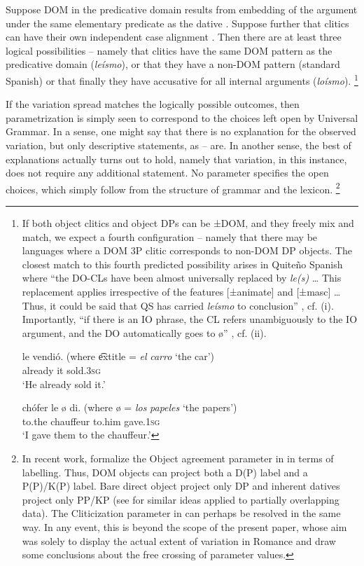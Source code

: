 \documentclass[output=paper,colorlinks,citecolor=brown,nonflat]{./langscibook}
\begin{document}
Suppose DOM in the predicative domain results from embedding of the argument under the same elementary predicate as the dative . Suppose further that clitics can have their own independent case alignment . Then there are at least three logical possibilities – namely that clitics have the same DOM pattern as the predicative domain (\textit{leísmo}), or that they have a non-DOM pattern (standard Spanish) or that finally they have accusative for all internal arguments (\textit{loísmo}).{} \footnote{If both object clitics and object DPs can be ±DOM, and they freely mix and match, we expect a fourth configuration – namely that there may be languages where a DOM 3P clitic corresponds to non-DOM DP objects. The closest match to this fourth predicted possibility arises in Quiteño Spanish where “the DO-CLs have been almost universally replaced by \textit{le(s)} … This replacement applies irrespective of the features [±animate] and [±masc] …Thus, it could be said that QS has carried \textit{leísmo} to conclusion” \citep[387--388]{Suñer1989}, cf. (i). Importantly, “if there is an IO phrase, the CL refers unambiguously to the IO argument, and the DO automatically goes to ø” \citep[389]{Suñer1989}, cf. (ii).  

\ea%
    
     {le}   {vendió}.   \hfill (where \t	extit{le} {=} \textit{el} \textit{carro} ‘the car’)\\
        already   it   sold\textsc{.3sg}\\
    \glt ‘He already sold it.’
\z

\ea%
    
     {chófer}  {le}   {ø} {di}.   \hfill (where {ø} = \textit{los} \textit{papeles} ‘the papers’)\\
        to.the chauffeur   to.him   {} gave.\textsc{1sg}\\
    \glt ‘I gave them to the chauffeur.’
\z
}

If the variation spread matches the logically possible outcomes, then parametrization is simply seen to correspond to the choices left open by Universal Grammar. In a sense, one might say that there is no explanation for the observed variation, but only descriptive statements, as -- are. In another sense, the best of explanations actually turns out to hold, namely that variation, in this instance, does not require any additional statement. No parameter specifies the open choices, which simply follow from the structure of grammar and the lexicon.{} \footnote{In recent work, \citet{ManziniFranco2019} formalize the Object agreement parameter in  in terms of labelling. Thus, DOM objects can project both a D(P) label and a P(P)/K(P) label. Bare direct object project only DP and inherent datives project only PP/KP (see  for similar ideas applied to partially overlapping data). The Cliticization parameter in  can perhaps be resolved in the same way. In any event, this is beyond the scope of the present paper, whose aim was solely to display the actual extent of variation in Romance and draw some conclusions about the free crossing of parameter values.} 
\end{document}
